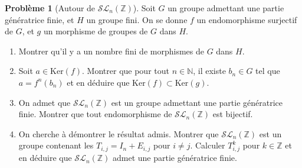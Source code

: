 \documentclass[french]{book}
\newcommand{\N}{\mathbb{N}}
\newcommand{\Z}{\mathbb{Z}}
\renewcommand{\ker}{\text{Ker}}
\theoremstyle{definition}
\newtheorem{pro}{Problème}[chapter]
\theoremstyle{remark}
\begin{document}
\begin{pro}[Autour de $\mathcal{SL}_n(\Z)$]
	Soit $G$ un groupe admettant une partie génératrice finie, et $H$ un groupe fini. On se donne $f$ un endomorphisme surjectif de $G$, et $g$ un morphisme de groupes de $G$ dans $H$.
	\begin{enumerate}
		\item Montrer qu'il y a un nombre fini de morphismes de $G$ dans $H$.
		\item Soit $a\in\ker(f)$. Montrer que pour tout $n\in\N$, il existe $b_n\in G$ tel que $a=f^n(b_n)$ et en déduire que $\ker(f)\subset\ker(g)$.
		\item On admet que $\mathcal{SL}_n(\Z)$ est un groupe admettant une partie génératrice finie. Montrer que tout endomorphisme de $\mathcal{SL}_n(\Z)$ est bijectif.
		\item On cherche à démontrer le résultat admis. Montrer que $\mathcal{SL}_n(\Z)$ est un groupe contenant les $T_{i,j}=I_n+E_{i,j}$ pour $i\ne j$. Calculer $T_{i,j}^k$ pour $k\in\Z$ et en déduire que $\mathcal{SL}_n(\Z)$ admet une partie génératrice finie.
	\end{enumerate}
\end{pro}
\end{document}
